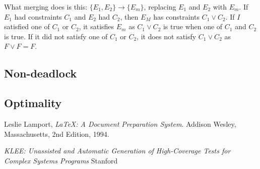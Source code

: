 \documentclass[12pt,a4paper]{article}
\begin{document}
What merging does is this: $\{E_1, E_2\} \rightarrow \{E_m\}$, replacing $E_1$ and $E_2$ with $E_m$. If $E_1$ had constraints $C_1$ and $E_2$ had $C_2$, then $E_M$ has constraints $C_1 \vee C_2$. If $I$ satisfied one of $C_1$ or $C_2$, it satisfies $E_m$ as $C_1 \vee C_2$ is true when one of $C_1$ and $C_2$ is true. If it did not satisfy one of $C_1$ or $C_2$, it does not satisfy $C_1 \vee C_2$ as $F \vee F = F$.

\subsection{Non-deadlock}

\subsection{Optimality}

\begin{thebibliography}{9}

         Leslie Lamport,
          \emph{\LaTeX: A Document Preparation System}.
	  Addison Wesley, Massachusetts,
	  2nd Edition,
	  1994.

         \emph{KLEE: Unassisted and Automatic Generation of High-Coverage Tests for Complex Systems Programs}
         Stanford
\end{thebibliography}
\end{document}
